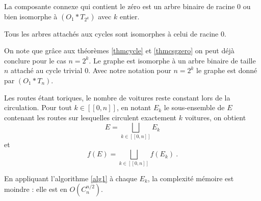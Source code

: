 \begin{thm}\label{thmcsgzero}
La composante connexe qui contient le z\'ero est un arbre binaire de racine $0$ ou bien isomorphe \`a $(O_1*T_{2^k})$ avec $k$ entier. 
\end{thm}

\begin{thm}\label{thmiso}
Tous les arbres attach\'es aux cycles sont isomorphes \`a celui de racine $0$. 
\end{thm}

\begin{rem}
On note que grâce aux th\'eor\`emes \ref{thmcycle} et \ref{thmcsgzero} on peut d\'ej\`a conclure pour le cas $n=2^k$. Le graphe est isomorphe \`a un arbre binaire de taille $n$ attach\'e au cycle trivial $0$. Avec notre notation pour $n = 2^k$ le graphe est donn\'e par $(O_1*T_n)$.
\end{rem}


\begin{lem}
Les routes \'etant toriques, le nombre de voitures reste constant lors de la circulation. Pour tout $k\in [\![0, n]\!]$, en notant $E_k$ le sous-ensemble de $E$ contenant les routes sur lesquelles circulent exactement $k$ voitures, on obtient \[E = \underset{k\in [\![0, n]\!]}{\bigsqcup} E_k\] et \[f(E) = \underset{k\in [\![0, n]\!]}{\bigsqcup} f(E_{k})\ \text{.}\]
\par
\end{lem}

\begin{csq}
En appliquant l'algorithme \ref{alg1} \`a chaque $E_k$, la complexit\'e m\'emoire est moindre : elle est en $O(C^{n/2}_{n})$.
\end{csq}


